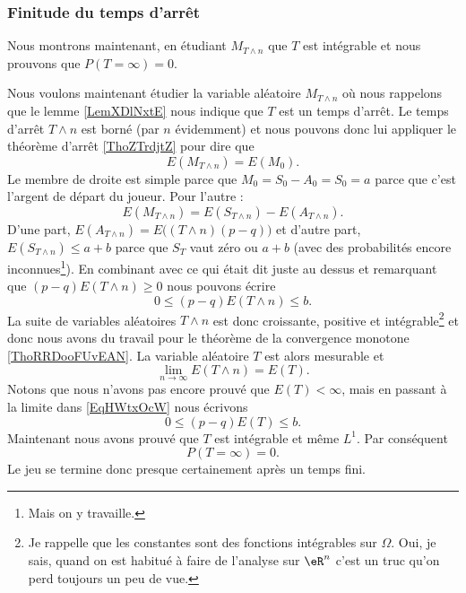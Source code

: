 \subsubsection{Finitude du temps d'arrêt}

Nous montrons maintenant, en étudiant \( M_{T\wedge n}\) que \( T\) est intégrable et nous prouvons que \( P(T=\infty)=0\).

Nous voulons maintenant étudier la variable aléatoire \( M_{T\wedge n}\) où nous rappelons que le lemme \ref{LemXDlNxtE} nous indique que \( T\) est un temps d'arrêt. Le temps d'arrêt \( T\wedge n\) est borné (par \( n\) évidemment) et nous pouvons donc lui appliquer le théorème d'arrêt \ref{ThoZTrdjtZ} pour dire que 
\begin{equation}
    E(M_{T\wedge n})=E(M_0).
\end{equation}
Le membre de droite est simple parce que \( M_0=S_0-A_0=S_0=a\) parce que c'est l'argent de départ du joueur. Pour l'autre :
\begin{equation}    \label{EqKEkJvBg}
    E(M_{T\wedge n})=E(S_{T\wedge n})-E(A_{T\wedge n}).
\end{equation}
D'une part, \( E(A_{T\wedge n})=E\big( (T\wedge n)(p-q) \big)\) et d'autre part, \( E(S_{T\wedge n})\leq a+b\) parce que \( S_T\) vaut zéro ou \( a+b\) (avec des probabilités encore inconnues\footnote{Mais on y travaille.}). En combinant avec ce qui était dit juste au dessus et remarquant que \( (p-q)E(T\wedge n)\geq 0\) nous pouvons écrire
\begin{equation}    \label{EqHWtxOcW}
    0\leq (p-q)E(T\wedge n)\leq b.
\end{equation}
La suite de variables aléatoires \( T\wedge n\) est donc croissante, positive et intégrable\footnote{Je rappelle que les constantes sont des fonctions intégrables sur \( \Omega\). Oui, je sais, quand on est habitué à faire de l'analyse sur \( \eR^n\) c'est un truc qu'on perd toujours un peu de vue.} et donc nous avons du travail pour le théorème de la convergence monotone \ref{ThoRRDooFUvEAN}. La variable aléatoire \( T\) est alors mesurable et
\begin{equation}    \label{EqABPXmgr}
    \lim_{n\to \infty} E(T\wedge n)=E(T).
\end{equation}
Notons que nous n'avons pas encore prouvé que \( E(T)<\infty\), mais en passant à la limite dans \eqref{EqHWtxOcW} nous écrivons
\begin{equation}
    0\leq (p-q)E(T)\leq b.
\end{equation}
Maintenant nous avons prouvé que \( T\) est intégrable et même \( L^1\). Par conséquent 
\begin{equation}
    P(T=\infty)=0.
\end{equation}
Le jeu se termine donc presque certainement après un temps fini.

